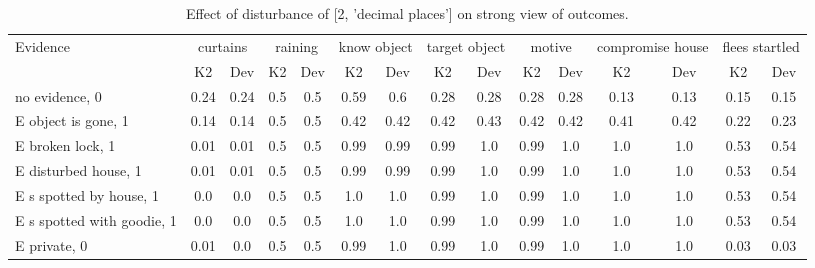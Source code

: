 \begin{table}\begin{tabular}{l|cc|cc|cc|cc|cc|cc|cc}\toprule\multirow{2}{*}{Evidence} & \multicolumn{2}{c}{curtains}& \multicolumn{2}{c}{raining}& \multicolumn{2}{c}{know object}& \multicolumn{2}{c}{target object}& \multicolumn{2}{c}{motive}& \multicolumn{2}{c}{compromise house}& \multicolumn{2}{c}{flees startled}\\& {K2} & {Dev}& {K2} & {Dev}& {K2} & {Dev}& {K2} & {Dev}& {K2} & {Dev}& {K2} & {Dev}& {K2} & {Dev}\\\midrule
no evidence, 0 & 0.24&0.24&0.5&0.5&0.59&0.6&0.28&0.28&0.28&0.28&0.13&0.13&0.15&0.15\\E object is gone, 1 & 0.14&0.14&0.5&0.5&0.42&0.42&0.42&0.43&0.42&0.42&0.41&0.42&0.22&0.23\\E broken lock, 1 & 0.01&0.01&0.5&0.5&0.99&0.99&0.99&1.0&0.99&1.0&1.0&1.0&0.53&0.54\\E disturbed house, 1 & 0.01&0.01&0.5&0.5&0.99&0.99&0.99&1.0&0.99&1.0&1.0&1.0&0.53&0.54\\E s spotted by house, 1 & 0.0&0.0&0.5&0.5&1.0&1.0&0.99&1.0&0.99&1.0&1.0&1.0&0.53&0.54\\E s spotted with goodie, 1 & 0.0&0.0&0.5&0.5&1.0&1.0&0.99&1.0&0.99&1.0&1.0&1.0&0.53&0.54\\E private, 0 & 0.01&0.0&0.5&0.5&0.99&1.0&0.99&1.0&0.99&1.0&1.0&1.0&0.03&0.03\\\bottomrule\end{tabular}\caption{Effect of disturbance of [2, 'decimal places'] on strong view of outcomes.}\end{table}